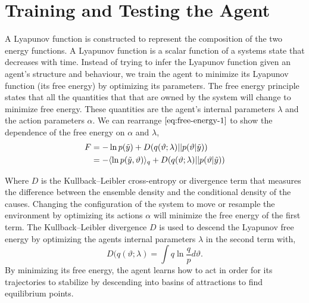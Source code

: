 \documentclass{article}
\begin{document}
\section{Training and Testing the Agent}

A Lyapunov function is constructed to represent the composition of the two energy functions. A Lyapunov function is a scalar function of a systems state that decreases with time. Instead of trying to infer the Lyapunov function given an agent's structure and behaviour, we train the agent to minimize its Lyapunov function (its free energy) by optimizing its parameters. The free energy principle states that all the quantities that that are owned by the system will change to minimize free energy. These quantities are the agent's internal parameters $\lambda$ and the action parameters $\alpha$. We can rearrange $\eqref{eq:free-energy-1}$ to show the dependence of the free energy on $\alpha$ and $\lambda$,
\begin{align}\label{eq:free-energy-2}
\begin{split}
F &= -\ln p (\Tilde{y}) + D(q(\vartheta;\lambda) || p(\vartheta|\Tilde{y}))\\
&=  - \langle \ln p(\Tilde{y},\vartheta) \rangle_q + D(q(\vartheta;\lambda) || p(\vartheta|\Tilde{y}))
\end{split}
\end{align}

Where $D$ is the Kullback–Leibler cross-entropy or divergence term that measures the difference between the ensemble density and the conditional density of the causes. Changing the configuration of the system to move or resample the environment by optimizing its actions $\alpha$ will minimize the free energy of the first term. The Kullback–Leibler divergence $D$ is used to descend the Lyapunov free energy by optimizing the agents internal parameters $\lambda$ in the second term with,
\[
D(q(\vartheta;\lambda) = \int q \ln \frac{q}{p} d\vartheta.
\]
By minimizing its free energy, the agent learns how to act in order for its trajectories to stabilize by descending into basins of attractions to find equilibrium points.



\end{document}
